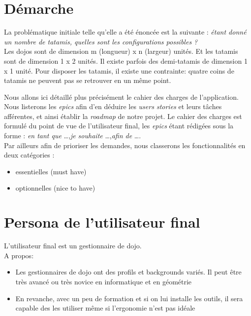 \section{Démarche}

La problématique initiale telle qu'elle a été énoncée est la suivante : \emph{étant donné un nombre de tatamis, quelles sont les 
configurations possibles ?}\\

Les dojos sont de dimension m (longueur) x n (largeur) unités. Et les tatamis sont de dimension 1 x 2 unités. Il existe parfois des demi-tatamis de dimension 1 x 1 unité.
Pour disposer les tatamis, il existe une contrainte: quatre coins de tatamis ne peuvent pas se retrouver en un même point.

Nous allons ici détaillé plus précisément le cahier des charges de l'application. Nous listerons les \emph{epics} afin d'en déduire
les \emph{users stories} et leurs tâches afférentes, et ainsi établir la \emph{roadmap} de notre projet. Le cahier des charges est formulé 
du point de vue de l'utilisateur final, les \emph{epics} étant rédigées sous la forme : \emph{en tant que} \dots ,\emph{je souhaite} \dots ,\emph{afin de } \dots.\\


Par ailleurs afin de prioriser les demandes, nous classerons les fonctionnalités en deux catégories :

\begin{itemize}
    \item essentielles (must have)
    \item optionnelles (nice to have)
\end{itemize}

\section{Persona de l’utilisateur final}

L’utilisateur final est un gestionnaire de dojo.\\

A propos:
\begin{itemize}
    \item Les gestionnaires de dojo ont des profils et backgrounds variés. Il peut être très avancé 
    ou très novice en informatique et en géométrie
    \item En revanche, avec un peu de formation et si on lui installe les outils, il sera capable 
    des les utiliser même si l’ergonomie n’est pas idéale
\end{itemize}


